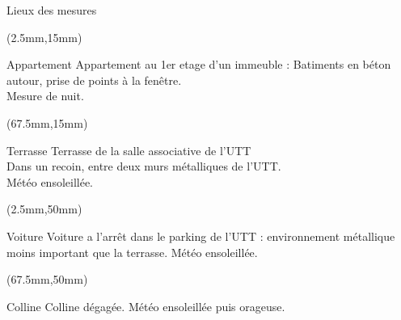 \documentclass[10pt]{beamer}
\begin{document}
  \begin{frame}{Lieux des mesures}
  		\begin{textblock*}{60mm}(2.5mm,15mm)
	  		\begin{block}{Appartement}
				Appartement au 1er etage d’un immeuble : Batiments en béton autour, prise de points à la fenêtre.\\ Mesure de nuit.
			\end{block}
  		\end{textblock*}

  		 \begin{textblock*}{61mm}(67.5mm,15mm)
  		 	\begin{block}{Terrasse}
				Terrasse de la salle associative de l’UTT\\ Dans un recoin, entre deux murs métalliques de l’UTT.\\ Météo ensoleillée.
			\end{block}
  		\end{textblock*}

  		\begin{textblock*}{60mm}(2.5mm,50mm)
  		 	\begin{block}{Voiture}
				Voiture a l’arrêt dans le parking de l’UTT : environnement métallique moins important que la terrasse. Météo ensoleillée.
			\end{block}
  		\end{textblock*}


		\begin{textblock*}{60mm}(67.5mm,50mm)
			\begin{block}{Colline}
				Colline dégagée. Météo ensoleillée puis orageuse.
			\end{block}
		\end{textblock*}
  \end{frame}
  
\end{document}
